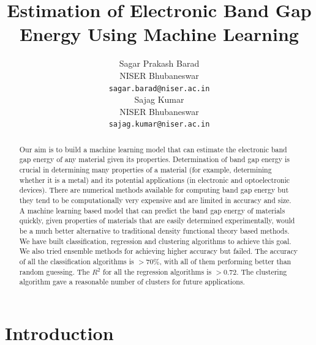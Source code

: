 \documentclass{article}
\title{Estimation of Electronic Band Gap Energy Using Machine Learning}
\author{
  Sagar Prakash Barad\\
  NISER Bhubaneswar\\
  \texttt{sagar.barad@niser.ac.in} \\
  \And
  Sajag Kumar\\
  NISER Bhubaneswar\\
  \texttt{sajag.kumar@niser.ac.in} \\
}
\begin{document}
\maketitle


\begin{abstract}
Our aim is to build a machine learning model that can estimate the electronic band gap energy of any material given its properties. Determination of band gap energy is crucial in determining many properties of a material (for example, determining whether it is a metal) and its potential applications (in electronic and optoelectronic devices). There are numerical methods available for computing band gap energy but they tend to be computationally very expensive and are limited in accuracy and size. A machine learning based model that can predict the band gap energy of materials quickly, given properties of materials that are easily determined experimentally, would be a much better alternative to traditional density functional theory based methods. We have built classification, regression and clustering algorithms to achieve this goal. We also tried ensemble methods for achieving higher accuracy but failed. The accuracy of all the classification algorithms is $>70\%$, with all of them performing better than random guessing. The $R^2$ for all the regression algorithms is $>0.72$. The clustering algorithm gave a reasonable number of clusters for future applications. 
\end{abstract}


\section{Introduction}
\end{document}
